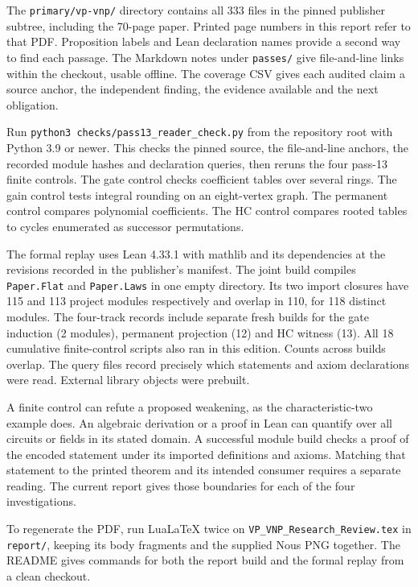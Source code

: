 \newpage
{}
\label{sec:reproduction}
The \texttt{primary/vp-vnp/} directory contains all 333 files in the pinned publisher subtree, including the 70-page paper. Printed page numbers in this report refer to that PDF. Proposition labels and Lean declaration names provide a second way to find each passage. The Markdown notes under \texttt{passes/} give file-and-line links within the checkout, usable offline. The coverage CSV gives each audited claim a source anchor, the independent finding, the evidence available and the next obligation.

Run \texttt{python3 checks/pass13\_reader\_check.py} from the repository root with Python 3.9 or newer. This checks the pinned source, the file-and-line anchors, the recorded module hashes and declaration queries, then reruns the four pass-13 finite controls. The gate control checks coefficient tables over several rings. The gain control tests integral rounding on an eight-vertex graph. The permanent control compares polynomial coefficients. The HC control compares rooted tables to cycles enumerated as successor permutations.

The formal replay uses Lean 4.33.1 with mathlib and its dependencies at the revisions recorded in the publisher's manifest. The joint build compiles \texttt{Paper.Flat} and \texttt{Paper.Laws} in one empty directory. Its two import closures have 115 and 113 project modules respectively and overlap in 110, for 118 distinct modules. The four-track records include separate fresh builds for the gate induction (2 modules), permanent projection (12) and HC witness (13). All 18 cumulative finite-control scripts also ran in this edition. Counts across builds overlap. The query files record precisely which statements and axiom declarations were read. External library objects were prebuilt.

A finite control can refute a proposed weakening, as the characteristic-two example does. An algebraic derivation or a proof in Lean can quantify over all circuits or fields in its stated domain. A successful module build checks a proof of the encoded statement under its imported definitions and axioms. Matching that statement to the printed theorem and its intended consumer requires a separate reading. The current report gives those boundaries for each of the four investigations.

To regenerate the PDF, run LuaLaTeX twice on \texttt{VP\_VNP\_Research\_Review.tex} in \texttt{report/}, keeping its body fragments and the supplied Nous PNG together. The README gives commands for both the report build and the formal replay from a clean checkout.

